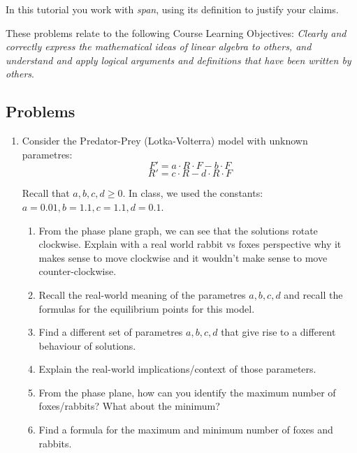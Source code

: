 		\begin{objectives}
			In this tutorial you work with \emph{span}, using its definition to justify
			your claims.

	These problems relate to the following Course Learning Objectives:
			\textit{Clearly and correctly express the mathematical ideas of linear algebra to others, and
			understand and apply logical arguments and definitions that have been written by others}.
		\end{objectives}

\subsection*{Problems}


\begin{enumerate}
	\item Consider the Predator-Prey (Lotka-Volterra) model with unknown parametres:
		$$
			F' = a \cdot R\cdot F - b \cdot F 
		$$
		$$
			R' = c \cdot R - d \cdot R \cdot F
		$$
	
	Recall that $a,b,c,d\geq 0$. 
	In class, we used the constants: $a=0.01, b=1.1, c=1.1, d=0.1$.
	
	
	
	\begin{enumerate}
		\item From the phase plane graph, we can see that the solutions rotate clockwise. Explain with a real world rabbit vs foxes perspective why it makes sense to move clockwise and it wouldn't make sense to move counter-clockwise. \\
	
		\item Recall the real-world meaning of the parametres $a,b,c,d$ and recall the formulas for the equilibrium points for this model. 
		\item Find a different set of parametres $a,b,c,d$ that give rise to a different behaviour of solutions. 
		\item Explain the real-world implications/context of those parameters. \\

		\item From the phase plane, how can you identify the maximum number of foxes/rabbits? What about the minimum?
		\item Find a formula for the maximum and minimum number of foxes and rabbits. \\
		


\end{enumerate}
\end{enumerate}
